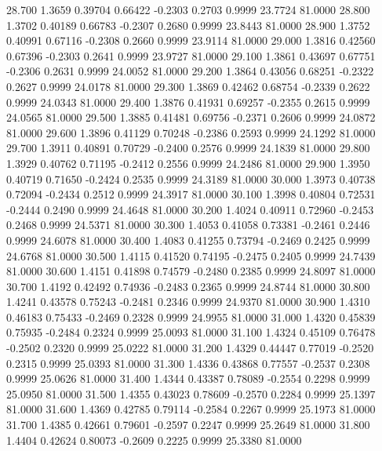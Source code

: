   28.700   1.3659   0.39704   0.66422  -0.2303   0.2703   0.9999  23.7724  81.0000
  28.800   1.3702   0.40189   0.66783  -0.2307   0.2680   0.9999  23.8443  81.0000
  28.900   1.3752   0.40991   0.67116  -0.2308   0.2660   0.9999  23.9114  81.0000
  29.000   1.3816   0.42560   0.67396  -0.2303   0.2641   0.9999  23.9727  81.0000
  29.100   1.3861   0.43697   0.67751  -0.2306   0.2631   0.9999  24.0052  81.0000
  29.200   1.3864   0.43056   0.68251  -0.2322   0.2627   0.9999  24.0178  81.0000
  29.300   1.3869   0.42462   0.68754  -0.2339   0.2622   0.9999  24.0343  81.0000
  29.400   1.3876   0.41931   0.69257  -0.2355   0.2615   0.9999  24.0565  81.0000
  29.500   1.3885   0.41481   0.69756  -0.2371   0.2606   0.9999  24.0872  81.0000
  29.600   1.3896   0.41129   0.70248  -0.2386   0.2593   0.9999  24.1292  81.0000
  29.700   1.3911   0.40891   0.70729  -0.2400   0.2576   0.9999  24.1839  81.0000
  29.800   1.3929   0.40762   0.71195  -0.2412   0.2556   0.9999  24.2486  81.0000
  29.900   1.3950   0.40719   0.71650  -0.2424   0.2535   0.9999  24.3189  81.0000
  30.000   1.3973   0.40738   0.72094  -0.2434   0.2512   0.9999  24.3917  81.0000
  30.100   1.3998   0.40804   0.72531  -0.2444   0.2490   0.9999  24.4648  81.0000
  30.200   1.4024   0.40911   0.72960  -0.2453   0.2468   0.9999  24.5371  81.0000
  30.300   1.4053   0.41058   0.73381  -0.2461   0.2446   0.9999  24.6078  81.0000
  30.400   1.4083   0.41255   0.73794  -0.2469   0.2425   0.9999  24.6768  81.0000
  30.500   1.4115   0.41520   0.74195  -0.2475   0.2405   0.9999  24.7439  81.0000
  30.600   1.4151   0.41898   0.74579  -0.2480   0.2385   0.9999  24.8097  81.0000
  30.700   1.4192   0.42492   0.74936  -0.2483   0.2365   0.9999  24.8744  81.0000
  30.800   1.4241   0.43578   0.75243  -0.2481   0.2346   0.9999  24.9370  81.0000
  30.900   1.4310   0.46183   0.75433  -0.2469   0.2328   0.9999  24.9955  81.0000
  31.000   1.4320   0.45839   0.75935  -0.2484   0.2324   0.9999  25.0093  81.0000
  31.100   1.4324   0.45109   0.76478  -0.2502   0.2320   0.9999  25.0222  81.0000
  31.200   1.4329   0.44447   0.77019  -0.2520   0.2315   0.9999  25.0393  81.0000
  31.300   1.4336   0.43868   0.77557  -0.2537   0.2308   0.9999  25.0626  81.0000
  31.400   1.4344   0.43387   0.78089  -0.2554   0.2298   0.9999  25.0950  81.0000
  31.500   1.4355   0.43023   0.78609  -0.2570   0.2284   0.9999  25.1397  81.0000
  31.600   1.4369   0.42785   0.79114  -0.2584   0.2267   0.9999  25.1973  81.0000
  31.700   1.4385   0.42661   0.79601  -0.2597   0.2247   0.9999  25.2649  81.0000
  31.800   1.4404   0.42624   0.80073  -0.2609   0.2225   0.9999  25.3380  81.0000
